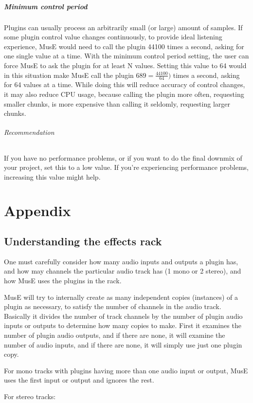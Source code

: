 \documentclass[a4paper]{report}
\begin{document}
\paragraph{Minimum control period}
Plugins can usually process an arbitrarily small (or large) amount
of samples. If some plugin control value changes continuously, to provide
ideal listening experience, MusE would need to call the plugin 44100
times a second, asking for one single value at a time. With the minimum
control period setting, the user can force MusE to ask the plugin for
at least N values. Setting this value to 64 would in this situation
make MusE call the plugin $689=\frac{44100}{64})$ times a second,
asking for 64 values at a time. While doing this will reduce accuracy
of control changes, it may also reduce CPU usage, because calling
the plugin more often, requesting smaller chunks, is more expensive
than calling it seldomly, requesting larger chunks.
\subparagraph{Recommendation}
If you have no performance problems, or if you want to do the final
downmix of your project, set this to a low value. If you're experiencing
performance problems, increasing this value might help.

\chapter{Appendix}
\label{apx_effects_rack} \section{Understanding the effects rack} 
One must carefully consider how many audio inputs and outputs a plugin
has, and how may channels the particular audio track has (1 mono or
2 stereo), and how MusE uses the plugins in the rack.

MusE will try to internally create as many independent copies
(instances) of a plugin as necessary, to satisfy the number of channels
in the audio track.
Basically it divides the number of track channels by the number of 
plugin audio inputs or outputs to determine how many copies to make.
First it examines the number of plugin audio outputs, and if there are
none, it will examine the number of audio inputs, and if there are
none, it will simply use just one plugin copy.

For mono tracks with plugins having more than one audio input or
output, MusE uses the first input or output and ignores the rest. 

For stereo tracks:
\end{document}
